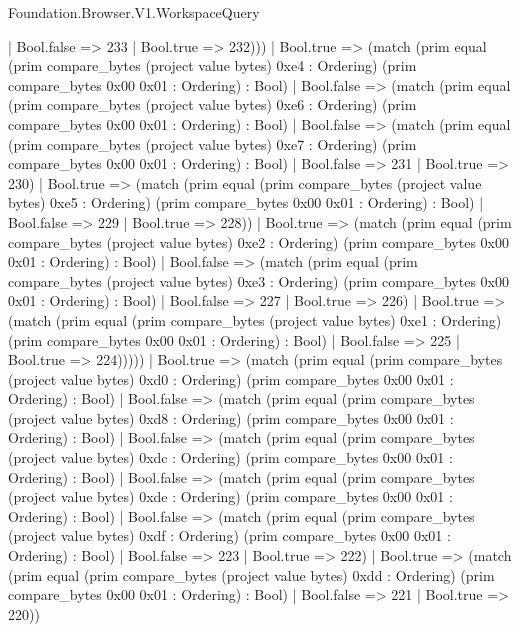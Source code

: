 \begin{lexlean}{Foundation.Browser.V1.WorkspaceQuery}
\begin{semanticmodule}
{                    | Bool.false => 233
                    | Bool.true => 232)))
              | Bool.true => (match (prim equal (prim compare_bytes (project value bytes) 0xe4 : Ordering) (prim compare_bytes 0x00 0x01 : Ordering) : Bool)
                | Bool.false => (match (prim equal (prim compare_bytes (project value bytes) 0xe6 : Ordering) (prim compare_bytes 0x00 0x01 : Ordering) : Bool)
                  | Bool.false => (match (prim equal (prim compare_bytes (project value bytes) 0xe7 : Ordering) (prim compare_bytes 0x00 0x01 : Ordering) : Bool)
                    | Bool.false => 231
                    | Bool.true => 230)
                  | Bool.true => (match (prim equal (prim compare_bytes (project value bytes) 0xe5 : Ordering) (prim compare_bytes 0x00 0x01 : Ordering) : Bool)
                    | Bool.false => 229
                    | Bool.true => 228))
                | Bool.true => (match (prim equal (prim compare_bytes (project value bytes) 0xe2 : Ordering) (prim compare_bytes 0x00 0x01 : Ordering) : Bool)
                  | Bool.false => (match (prim equal (prim compare_bytes (project value bytes) 0xe3 : Ordering) (prim compare_bytes 0x00 0x01 : Ordering) : Bool)
                    | Bool.false => 227
                    | Bool.true => 226)
                  | Bool.true => (match (prim equal (prim compare_bytes (project value bytes) 0xe1 : Ordering) (prim compare_bytes 0x00 0x01 : Ordering) : Bool)
                    | Bool.false => 225
                    | Bool.true => 224)))))
          | Bool.true => (match (prim equal (prim compare_bytes (project value bytes) 0xd0 : Ordering) (prim compare_bytes 0x00 0x01 : Ordering) : Bool)
            | Bool.false => (match (prim equal (prim compare_bytes (project value bytes) 0xd8 : Ordering) (prim compare_bytes 0x00 0x01 : Ordering) : Bool)
              | Bool.false => (match (prim equal (prim compare_bytes (project value bytes) 0xdc : Ordering) (prim compare_bytes 0x00 0x01 : Ordering) : Bool)
                | Bool.false => (match (prim equal (prim compare_bytes (project value bytes) 0xde : Ordering) (prim compare_bytes 0x00 0x01 : Ordering) : Bool)
                  | Bool.false => (match (prim equal (prim compare_bytes (project value bytes) 0xdf : Ordering) (prim compare_bytes 0x00 0x01 : Ordering) : Bool)
                    | Bool.false => 223
                    | Bool.true => 222)
                  | Bool.true => (match (prim equal (prim compare_bytes (project value bytes) 0xdd : Ordering) (prim compare_bytes 0x00 0x01 : Ordering) : Bool)
                    | Bool.false => 221
                    | Bool.true => 220))
}
\end{semanticmodule}
\end{lexlean}
